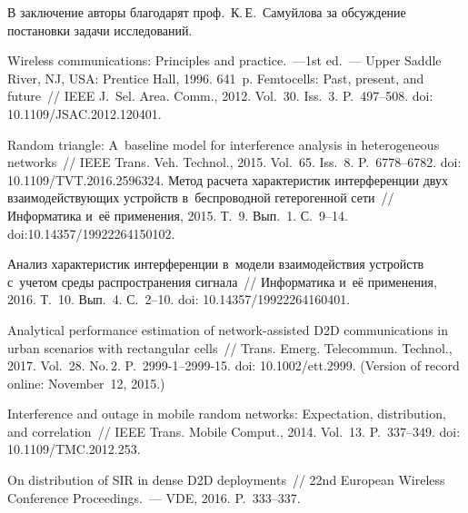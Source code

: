 \begin{multicols}{2}
  \smallskip
  
  В заключение авторы благодарят проф.\ К.\,Е.~Самуйлова за обсуждение 
постановки задачи исследований. 

{\small\frenchspacing
 {%
 \begin{thebibliography}{99}
 Wireless communications: Principles and practice.~---1st ed.~---
 Upper Saddle River, NJ, USA: Prentice Hall, 1996. 641~p.
 Femtocells: Past, present, 
and future~// IEEE J.~Sel. Area. Comm., 2012. Vol.~30. Iss.~3. P.~497--508. doi: 
10.1109/JSAC.2012.120401.

 Random 
triangle: A~baseline model for interference analysis in heterogeneous networks~// IEEE 
Trans. Veh. Technol., 2015. Vol.~65. Iss.~8. P.~6778--6782. doi: 
10.1109/TVT.2016.2596324.
 Метод расчета характеристик интерференции двух 
взаимодей\-ст\-ву\-ющих устройств в~беспроводной гетерогенной сети~// Информатика и~её 
применения, 2015. Т.~9. Вып.~1. С.~9--14. doi:10.14357/19922264150102.

Анализ характеристик интерференции в~модели взаимодействия устройств с~учетом среды 
распространения сигнала~// Информатика и~её применения, 2016. Т.~10. Вып.~4. С.~2--10.
doi: 10.14357/19922264160401.

 Analytical performance estimation of 
network-assisted D2D communications in urban scenarios with rectangular cells~// Trans.
 Emerg. 
Telecommun. Technol., 2017. Vol.~28. No.\,2. P.~2999-1--2999-15. 
doi: 10.1002/ett.2999.
 (Version of record 
online: November~12,  2015.)

 Interference and outage in mobile random networks: Expectation, 
distribution, and correlation~// IEEE Trans. Mobile Comput., 2014. Vol.~13.  
P.~337--349. doi: 10.1109/TMC.2012.253.

 On distribution of SIR in dense D2D deployments~// 22nd 
European Wireless Conference Proceedings.~--- VDE, 2016. 
P.~333--337.


\end{thebibliography}}}
\end{multicols}
